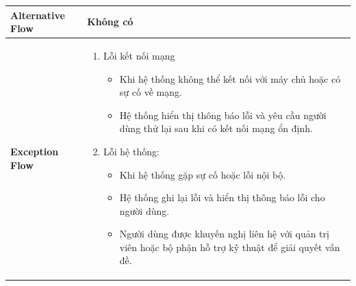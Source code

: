 \begin{longtable}[H]{|l|p{}|}
    \hline
        \textbf{Alternative Flow} & Không có \\
    \hline 
        \textbf{Exception Flow} & \vspace{-1cm} \begin{enumerate}[leftmargin=5.5mm]
            \item Lỗi kết nối mạng
                \begin{itemize}[topsep=0pt]
                    \setlength\itemsep{0em}
                    \item Khi hệ thống không thể kết nối với máy chủ hoặc có sự cố về mạng.
                    \item Hệ thống hiển thị thông báo lỗi và yêu cầu người dùng thử lại sau khi có kết nối mạng ổn định.
                \end{itemize}
            \item Lỗi hệ thống:
                \begin{itemize}[topsep=0pt]
                    \setlength\itemsep{0em}
                    \item Khi hệ thống gặp sự cố hoặc lỗi nội bộ.
                    \item Hệ thống ghi lại lỗi và hiển thị thông báo lỗi cho người dùng.
                    \item Người dùng được khuyến nghị liên hệ với quản trị viên hoặc bộ phận hỗ trợ kỹ thuật để giải quyết vấn đề.
                \end{itemize}
        \end{enumerate}\\
    \hline 
    \end{longtable}

